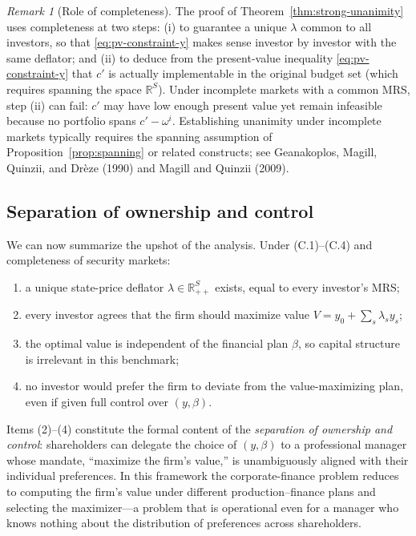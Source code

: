 \documentclass[11pt,a4paper]{article}
\def\R{\mathbb{R}}
\theoremstyle{plain}
\theoremstyle{definition}
\theoremstyle{remark}
\newtheorem{remark}[theorem]{Remark}
\begin{document}
\begin{remark}[Role of completeness]\label{rem:completeness-strong}
The proof of Theorem~\ref{thm:strong-unanimity} uses completeness at two steps: (i) to guarantee a unique $\lambda$ common to all investors, so that \eqref{eq:pv-constraint-y} makes sense investor by investor with the same deflator; and (ii) to deduce from the present-value inequality \eqref{eq:pv-constraint-y} that $c'$ is actually implementable in the original budget set (which requires spanning the space $\R^S$). Under incomplete markets with a common MRS, step (ii) can fail: $c'$ may have low enough present value yet remain infeasible because no portfolio spans $c' - \omega^i$. Establishing unanimity under incomplete markets typically requires the spanning assumption of Proposition~\ref{prop:spanning} or related constructs; see Geanakoplos, Magill, Quinzii, and Drèze (1990) and Magill and Quinzii (2009).
\end{remark}

\subsection{Separation of ownership and control}

We can now summarize the upshot of the analysis. Under \textup{(C.1)--(C.4)} and completeness of security markets:
\begin{enumerate}
  \item a unique state-price deflator $\lambda\in\R^S_{++}$ exists, equal to every investor's MRS;
  \item every investor agrees that the firm should maximize value $V = y_0+\sum_s\lambda_s y_s$;
  \item the optimal value is independent of the financial plan $\beta$, so capital structure is irrelevant in this benchmark;
  \item no investor would prefer the firm to deviate from the value-maximizing plan, even if given full control over $(y,\beta)$.
\end{enumerate}
Items (2)--(4) constitute the formal content of the \emph{separation of ownership and control}: shareholders can delegate the choice of $(y,\beta)$ to a professional manager whose mandate, ``maximize the firm's value,'' is unambiguously aligned with their individual preferences. In this framework the corporate-finance problem reduces to computing the firm's value under different production--finance plans and selecting the maximizer---a problem that is operational even for a manager who knows nothing about the distribution of preferences across shareholders.
\end{document}
